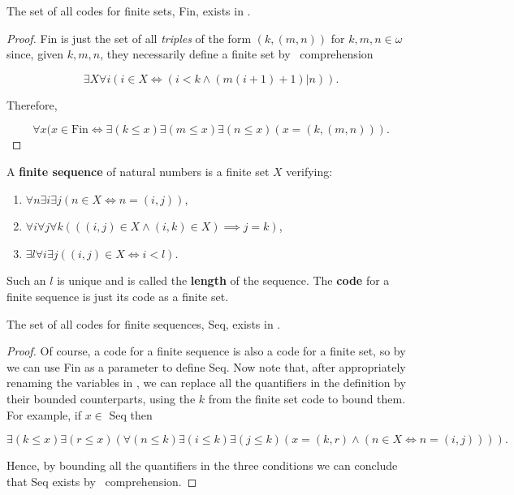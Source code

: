 \documentclass[../main.tex]{memoir}
\begin{document}
\begin{theorem}
  \label{thm:finite-sets-rca}
  The set of all codes for finite sets, Fin, exists in \rca.
\end{theorem}
\begin{proof}
  Fin is just the set of all \textit{triples} of the form $(k, (m, n))$ for $k, m, n \in \omega$ since, given $k, m, n$, they necessarily define a finite set by \rec\ comprehension

  \[ \exists X \forall i (i \in X \iff (i < k \land (m(i + 1) + 1) \vert n)). \]

  Therefore,

  \[ \forall x (x \in \text{Fin} \iff \exists (k \le x) \exists (m \le x) \exists (n \le x) (x = (k, (m, n))). \]
\end{proof}

\begin{definition}
  \label{def:finite-sequence}
  A \textbf{finite sequence} of natural numbers is a finite set $X$ verifying:

  \begin{enumerate}
  \item $\forall n \exists i \exists j (n \in X \iff n = (i, j))$,
  \item $\forall i \forall j \forall k (((i, j) \in X \land (i, k) \in X) \implies j = k)$,
  \item $\exists l \forall i \exists j ((i, j) \in X \iff i < l)$.
  \end{enumerate}

  Such an $l$ is unique and is called the \textbf{length} of the sequence. The \textbf{code} for a finite sequence is just its code as a finite set.
\end{definition}

\begin{theorem}
  The set of all codes for finite sequences, Seq, exists in \rca.
\end{theorem}
\begin{proof}
  Of course, a code for a finite sequence is also a code for a finite set, so by  we can use Fin as a parameter to define Seq. Now note that, after appropriately renaming the variables in , we can replace all the quantifiers in the definition by their bounded counterparts, using the $k$ from the finite set code to bound them. For example, if $x \in$ Seq then

  \[ \exists (k \le x) \exists (r \le x) (\forall (n \le k) \exists (i \le k) \exists (j \le k) (x = (k, r) \land (n \in X \iff n = (i, j)))). \]

  Hence, by bounding all the quantifiers in the three conditions we can conclude that Seq exists by \rec\ comprehension.
\end{proof}
\end{document}
